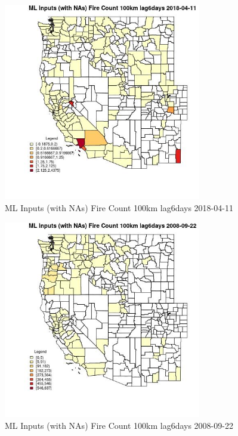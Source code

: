 \clearpage 

\begin{figure} 
\centering  
\includegraphics[width=0.77\textwidth]{Code_Outputs/Report_ML_input_PM25_Step4_part_e_de_duplicated_aves_compiled_2019-05-18wNAs_CountyFire_Count_100km_lag6daysMean2018-04-11.jpg} 
\caption{\label{fig:Report_ML_input_PM25_Step4_part_e_de_duplicated_aves_compiled_2019-05-18wNAsCountyFire_Count_100km_lag6daysMean2018-04-11}ML Inputs (with NAs) Fire Count 100km lag6days 2018-04-11} 
\end{figure} 
 

\begin{figure} 
\centering  
\includegraphics[width=0.77\textwidth]{Code_Outputs/Report_ML_input_PM25_Step4_part_e_de_duplicated_aves_compiled_2019-05-18wNAs_CountyFire_Count_100km_lag6daysMean2008-09-22.jpg} 
\caption{\label{fig:Report_ML_input_PM25_Step4_part_e_de_duplicated_aves_compiled_2019-05-18wNAsCountyFire_Count_100km_lag6daysMean2008-09-22}ML Inputs (with NAs) Fire Count 100km lag6days 2008-09-22} 
\end{figure} 
 

